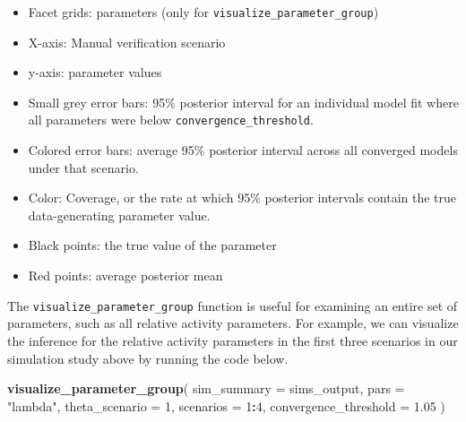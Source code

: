 \documentclass[
]{article}
\newenvironment{Shaded}{\begin{snugshade}}{\end{snugshade}}
\newcommand{\AttributeTok}[1]{\textcolor[rgb]{0.13,0.29,0.53}{#1}}
\newcommand{\DecValTok}[1]{\textcolor[rgb]{0.00,0.00,0.81}{#1}}
\newcommand{\FloatTok}[1]{\textcolor[rgb]{0.00,0.00,0.81}{#1}}
\newcommand{\FunctionTok}[1]{\textcolor[rgb]{0.13,0.29,0.53}{\textbf{#1}}}
\newcommand{\NormalTok}[1]{#1}
\newcommand{\SpecialCharTok}[1]{\textcolor[rgb]{0.81,0.36,0.00}{\textbf{#1}}}
\newcommand{\StringTok}[1]{\textcolor[rgb]{0.31,0.60,0.02}{#1}}
\providecommand{\tightlist}{%
  \setlength{\itemsep}{0pt}\setlength{\parskip}{0pt}}
\begin{document}
\begin{itemize}
\tightlist
\item
  Facet grids: parameters (only for \texttt{visualize\_parameter\_group})
\item
  X-axis: Manual verification scenario
\item
  y-axis: parameter values
\item
  Small grey error bars: 95\% posterior interval for an individual model fit where all parameters were below \texttt{convergence\_threshold}.
\item
  Colored error bars: average 95\% posterior interval across all converged models under that scenario.
\item
  Color: Coverage, or the rate at which 95\% posterior intervals contain the true data-generating parameter value.
\item
  Black points: the true value of the parameter
\item
  Red points: average posterior mean
\end{itemize}

The \texttt{visualize\_parameter\_group} function is useful for examining an entire set of parameters, such as all relative activity parameters. For example, we can visualize the inference for the relative activity parameters in the first three scenarios in our simulation study above by running the code below.

\linespread{1}

\begin{Shaded}
\begin{Highlighting}[]
\FunctionTok{visualize\_parameter\_group}\NormalTok{(}
  \AttributeTok{sim\_summary =}\NormalTok{ sims\_output, }
  \AttributeTok{pars =} \StringTok{"lambda"}\NormalTok{, }
  \AttributeTok{theta\_scenario =} \DecValTok{1}\NormalTok{, }
  \AttributeTok{scenarios =} \DecValTok{1}\SpecialCharTok{:}\DecValTok{4}\NormalTok{,}
  \AttributeTok{convergence\_threshold =} \FloatTok{1.05}
\NormalTok{)}
\end{Highlighting}
\end{Shaded}
\end{document}
